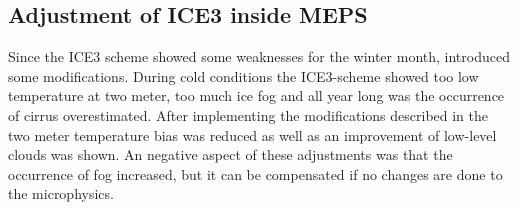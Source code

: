 \subsection{Adjustment of ICE3 inside MEPS}
Since the ICE3 scheme showed some weaknesses for the winter month, \cite{muller_arome-metcoop:_2017} introduced some modifications. 
During cold conditions the ICE3-scheme showed too low temperature at two meter, too much ice fog and all year long was the occurrence of cirrus overestimated. After implementing the modifications described in \cite{muller_arome-metcoop:_2017} the two meter temperature bias was reduced as well as an improvement of low-level clouds was shown. An negative aspect of these adjustments was that the occurrence of fog increased, but it can be compensated if no changes are done to the microphysics. 
















